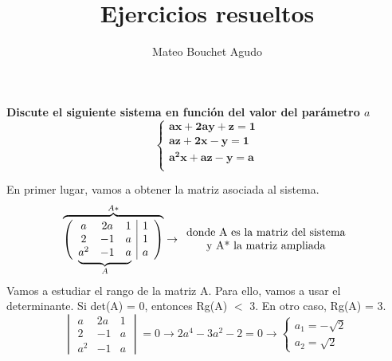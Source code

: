 \documentclass{article}
\author{Mateo Bouchet Agudo}
\title{Ejercicios resueltos}
\newcommand\undermat[2]{%
  \makebox[0pt][l]{$\smash{\underbrace{\phantom{%
    \begin{matrix}#2\end{matrix}}}_{\text{$#1$}}}$}#2}
\begin{document}
\maketitle

\justify

\begin{enumerate}
\textbf{Discute el siguiente sistema en funci\'on del valor del par\'ametro $a$}
$$\left \{\begin{array}{ll}\mathbf{a x + 2 a y + z = 1}\\\mathbf{a z + 2 x - y = 1}\\\mathbf{a^{2} x + a z - y = a}\\\end{array}\right.$$
\end{enumerate}
En primer lugar, vamos a obtener la matriz asociada al sistema.
$$\overbrace{\left(\begin{array}{ccc|c}a & 2 a & 1 & 1 \\2 & -1 & a & 1 \\\undermat{A}{a^{2} & -1 & a} & a \\\end{array}\right)}^{A*}\rightarrow \begin{array}{cc} \text{donde A es la matriz del sistema} \\\text{y A* la matriz ampliada} \end{array}$$\\

Vamos a estudiar el rango de la matriz A. Para ello, vamos a usar el determinante. Si det(A) = 0, entonces Rg(A) $<$ 3. En otro caso, Rg(A) = 3.
$$\begin{vmatrix}a & 2 a & 1 \\2 & -1 & a\\a^{2} & -1 & a\end{vmatrix}=0\to 2 a^{4} - 3 a^{2} - 2=0\to\left\{\begin{array}{cc}a_1=- \sqrt{2}\\a_2=\sqrt{2}\end{array}\right.$$
\end{document}
